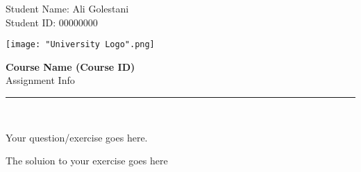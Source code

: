 \documentclass[11pt,letterpaper]{article}
\begin{document}
\pagestyle{plain}

\begin{flushleft}
Student Name: Ali Golestani\\
Student ID: 00000000
\end{flushleft}

\begin{flushright}\vspace{-12mm}
\texttt{[image: "University Logo".png]}
\end{flushright}
 
\begin{center}\vspace{-1cm}
\textbf{\large Course Name (Course ID)}\\
Assignment Info
\end{center}

\rule{\linewidth}{0.1mm}\\

\begin{question}
    Your question/exercise goes here.
\end{question}

\begin{solution}[print] %
    The soluion to your exercise goes here
\end{solution}
\end{document}
